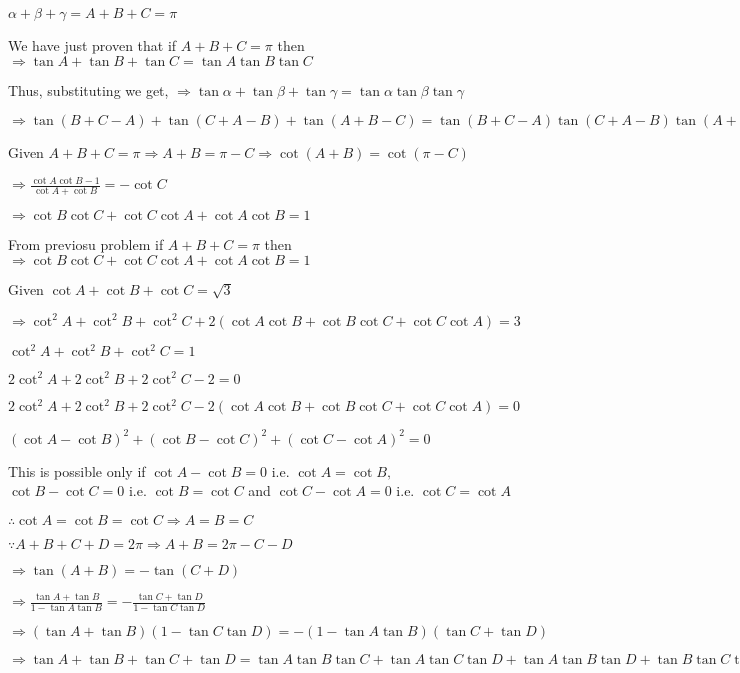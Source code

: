   $\alpha + \beta + \gamma = A + B + C = \pi$

  We have just proven that if $A + B + C = \pi$ then $\Rightarrow \tan A + \tan B + \tan C = \tan A\tan B\tan C$

  Thus, substituting we get, $\Rightarrow \tan\alpha + \tan\beta + \tan\gamma = \tan\alpha\tan\beta\tan\gamma$

  $\Rightarrow \tan(B + C - A) + \tan(C + A - B) + \tan(A + B - C) = \tan(B + C - A)\tan(C + A -
  B)\tan(A + B - C)$

\item Given $A + B + C = \pi\Rightarrow  A + B = \pi - C \Rightarrow \cot(A + B) = \cot(\pi - C)$

  $\Rightarrow \frac{\cot A\cot B - 1}{\cot A + \cot B} = -\cot C$

  $\Rightarrow \cot B\cot C + \cot C\cot A + \cot A\cot B = 1$

\item From previosu problem if $A + B + C = \pi$ then $\Rightarrow \cot B\cot C + \cot C\cot A + \cot A\cot B = 1$

  Given $\cot A + \cot B + \cot C = \sqrt{3}$

  $\Rightarrow \cot^2A + \cot^2B + \cot^2C + 2(\cot A\cot B + \cot B\cot C + \cot C\cot A) = 3$

  $\cot^2A + \cot^2B + \cot^2C = 1$

  $2\cot^2A + 2\cot^2B + 2\cot^2C - 2 = 0$

  $2\cot^2A + 2\cot^2B + 2\cot^2C - 2(\cot A\cot B + \cot B\cot C + \cot C\cot A) = 0$

  $(\cot A - \cot B)^2 + (\cot B - \cot C)^2 + (\cot C - \cot A)^2 = 0$

  This is possible only if $\cot A - \cot B = 0$ i.e. $\cot A = \cot B,$ $\cot B - \cot C = 0$ i.e. $\cot
  B = \cot C$ and $\cot C - \cot A = 0$ i.e. $\cot C = \cot A$

  $\therefore \cot A = \cot B = \cot C \Rightarrow A = B = C$

\item $\because A + B + C + D = 2\pi \Rightarrow A + B = 2\pi - C - D$

  $\Rightarrow \tan(A + B) = -\tan(C + D)$

  $\Rightarrow \frac{\tan A + \tan B}{1 - \tan A\tan B} = -\frac{\tan C + \tan D}{1 - \tan C\tan D}$

  $\Rightarrow (\tan A + \tan B)(1 - \tan C\tan D) = -(1 - \tan A\tan B)(\tan C + \tan D)$

  $\Rightarrow \tan A + \tan B + \tan C + \tan D = \tan A\tan B\tan C + \tan A\tan C\tan D + \tan A\tan B\tan D + \tan
  B\tan C\tan D$


